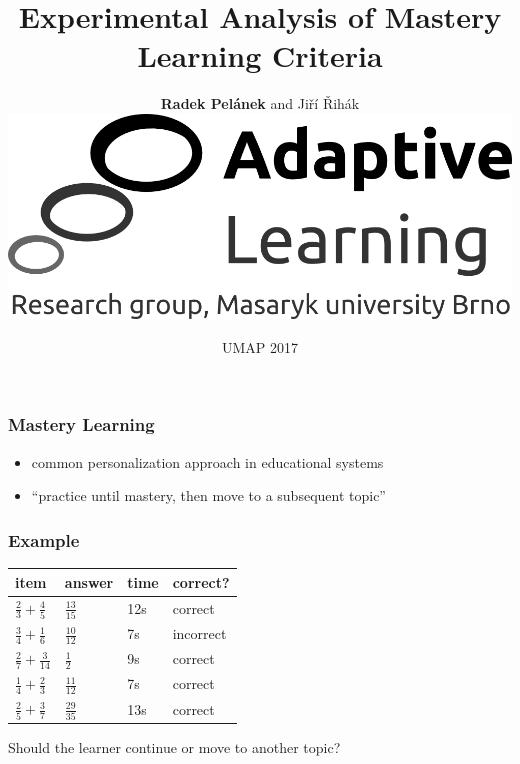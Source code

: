 \documentclass[bigger]{beamer}
\title{Experimental Analysis of Mastery Learning Criteria}
\author{\textbf{Radek Pel\'anek} and Ji\v{r}\'i \v{R}ih\'ak\\[10mm]
\includegraphics[width=.3\linewidth]{al-logo}
}
\date{UMAP 2017}
\begin{document}
\frame{\titlepage}

\begin{frame}
  \frametitle{Mastery Learning}

  \begin{itemize}
  \item common personalization approach in educational systems
  \item ``practice until mastery, then move to a subsequent topic''
  \end{itemize}
\end{frame}

\begin{frame}
  \frametitle{Example}

  \begin{center}
    \begin{tabular}{llll}
      \toprule
      item & answer & time & correct? \\
      \midrule
      $\frac{2}{3} + \frac{4}{5}$ & $\frac{13}{15}$ & 12s & {\color{mygreen}correct}\\[3mm]
      $\frac{3}{4} + \frac{1}{6}$ & $\frac{10}{12}$ & 7s & {\color{red}incorrect}\\[3mm]
      $\frac{2}{7} + \frac{3}{14}$ & $\frac{1}{2}$ & 9s & {\color{mygreen}correct}\\[3mm]
      $\frac{1}{4} + \frac{2}{3}$ & $\frac{11}{12}$ & 7s & {\color{mygreen}correct}\\[3mm]
      $\frac{2}{5} + \frac{3}{7}$ & $\frac{29}{35}$ & 13s & {\color{mygreen}correct}\\[3mm]
      \bottomrule
    \end{tabular}

\medskip

Should the learner continue or move to another topic?
  \end{center}
\end{frame}




\end{document}
